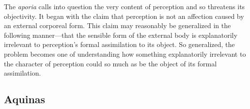 \documentclass[12pt]{article}
\begin{document}
The \emph{aporia} calls into question the very content of perception and so threatens its objectivity. It began with the claim that perception is not an affection caused by an external corporeal form. This claim may reasonably be generalized in the following manner---that the sensible form of the external body is explanatorily irrelevant to perception's formal assimilation to its object. So generalized, the problem becomes one of understanding how something explanatorily irrelevant to the character of perception could so much as be the object of its formal assimilation.


\subsection{Aquinas} %
\label{sub:aquinas}
\end{document}
